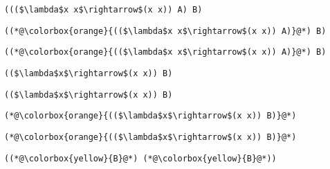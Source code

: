 \documentclass{beamer}
\begin{document}
\begin{frame}[fragile]{\CurrentSection}
\lstset{basicstyle=\ttfamily\small}\lstset{numbers=none}\lstset{language=ML}\begin{lstlisting}
((($\lambda$x x$\rightarrow$(x x)) A) B)
\end{lstlisting}
\pause\lstset{language=ML}\begin{lstlisting}
((*@\colorbox{orange}{(($\lambda$x x$\rightarrow$(x x)) A)}@*) B)
\end{lstlisting}

\end{frame}

\begin{frame}[fragile]{\CurrentSection}
\lstset{basicstyle=\ttfamily\small}\lstset{numbers=none}\lstset{language=ML}\begin{lstlisting}
((*@\colorbox{orange}{(($\lambda$x x$\rightarrow$(x x)) A)}@*) B)
\end{lstlisting}
\pause\lstset{language=ML}\begin{lstlisting}
(($\lambda$x$\rightarrow$(x x)) B)
\end{lstlisting}

\end{frame}

\begin{frame}[fragile]{\CurrentSection}
\lstset{basicstyle=\ttfamily\small}\lstset{numbers=none}\lstset{language=ML}\begin{lstlisting}
(($\lambda$x$\rightarrow$(x x)) B)
\end{lstlisting}
\pause\lstset{language=ML}\begin{lstlisting}
(*@\colorbox{orange}{(($\lambda$x$\rightarrow$(x x)) B)}@*)
\end{lstlisting}

\end{frame}

\begin{frame}[fragile]{\CurrentSection}
\lstset{basicstyle=\ttfamily\small}\lstset{numbers=none}\lstset{language=ML}\begin{lstlisting}
(*@\colorbox{orange}{(($\lambda$x$\rightarrow$(x x)) B)}@*)
\end{lstlisting}
\pause\lstset{language=ML}\begin{lstlisting}
((*@\colorbox{yellow}{B}@*) (*@\colorbox{yellow}{B}@*))
\end{lstlisting}

\end{frame}
\end{document}

